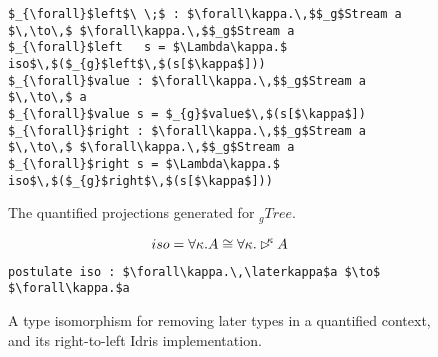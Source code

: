 \begin{figure}[h]
\begin{lstlisting}[mathescape]
$_{\forall}$left$\ \;$ : $\forall\kappa.\,$$_g$Stream a $\,\to\,$ $\forall\kappa.\,$$_g$Stream a
$_{\forall}$left   s = $\Lambda\kappa.$ iso$\,$($_{g}$left$\,$(s[$\kappa$]))
$_{\forall}$value : $\forall\kappa.\,$$_g$Stream a $\,\to\,$ a
$_{\forall}$value s = $_{g}$value$\,$(s[$\kappa$])
$_{\forall}$right : $\forall\kappa.\,$$_g$Stream a $\,\to\,$ $\forall\kappa.\,$$_g$Stream a
$_{\forall}$right s = $\Lambda\kappa.$ iso$\,$($_{g}$right$\,$(s[$\kappa$]))
\end{lstlisting}
  \caption{The quantified projections generated for $_{g}Tree$.}
\label{fig:tree_quantified_projections}
\end{figure}

\begin{figure}[h]
\[
iso = \forall \kappa .A\cong \forall\kappa.\rhd^{\!\!\kappa} A
\]
\begin{lstlisting}[mathescape]
postulate iso : $\forall\kappa.\,\laterkappa$a $\to$ $\forall\kappa.$a
\end{lstlisting}
  \caption{A type isomorphism for removing later types in a quantified context, and
    its right-to-left Idris implementation.}
\label{fig:quantified_later_iso}
\end{figure}



